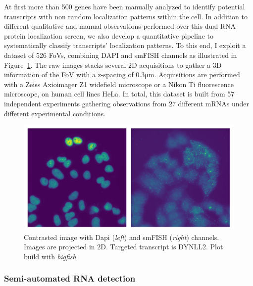 At first more than 500 genes have been manually analyzed to identify potential transcripts with non random localization patterns within the cell.
In addition to different qualitative and manual observations performed over this dual \ac{RNA}-protein localization screen, we also develop a quantitative pipeline to systematically classify transcripts' localization patterns.
To this end, I exploit a dataset of 526 \ac{FoV}s, combining DAPI and \ac{smFISH} channels as illustrated in Figure~\ref{fig:fov_racha}.
The raw images stacks several 2D acquisitions to gather a 3D information of the \ac{FoV} with a z-spacing of 0.3μm.
Acquisitions are performed with a Zeiss Axioimager Z1 widefield microscope or a Nikon Ti fluorescence microscope, on human cell lines HeLa.
In total, this dataset is built from 57 independent experiments gathering observations from 27 different \ac{mRNA}s under different experimental conditions.

\begin{figure}[]
    \centering
    \includegraphics[width=\textwidth]{figures/chapter5/FoV_DYNLL2}
    \caption{Contrasted image with Dapi (\textit{left}) and smFISH (\textit{right}) channels.
	Images are projected in 2D.
	Targeted transcript is DYNLL2.
	Plot build with \emph{bigfish}}
    \label{fig:fov_racha}
\end{figure}

\subsubsection{Semi-automated RNA detection}


